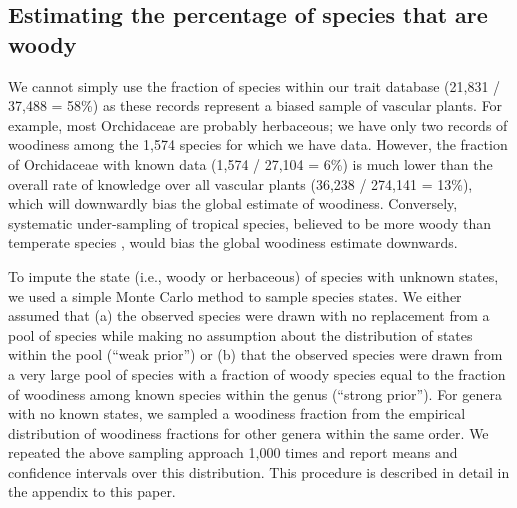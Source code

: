 \documentclass[12pt]{article}
\begin{document}

\subsection{Estimating the percentage of species that are woody}

We cannot simply use the fraction of species within our trait database
(21,831 / 37,488 = 58\%) as these records represent a biased sample of
vascular plants.
For example, most Orchidaceae are probably herbaceous; we have only
two records of woodiness among the 1,574 species for which we have
data.
However, the fraction of Orchidaceae with known data (1,574 / 27,104 =
6\%)
is much lower than the overall rate of knowledge over all vascular
plants (36,238 / 274,141 = 13\%), which will downwardly bias the
global estimate of woodiness.
%
Conversely, systematic under-sampling of tropical species, believed to
be more woody than temperate species \citep{Molesheihgt}, would bias
the global woodiness estimate downwards.

To impute the state (i.e., woody or herbaceous) of species with
unknown states, we used a simple Monte Carlo method to sample species
states.  We either assumed that (a) the observed species were drawn
with no replacement from a pool of species while making no assumption
about the distribution of states within the pool (``weak prior'') or
(b) that the observed species were drawn from a very large pool of
species with a fraction of woody species equal to the fraction of
woodiness among known species within the genus (``strong prior'').
%
For genera with no known states, we sampled a woodiness fraction from
the empirical distribution of woodiness fractions for other genera
within the same order.
%
We repeated the above sampling approach 1,000 times and report means
and confidence intervals over this distribution.
%
This procedure is described in detail in the appendix to this paper.
\end{document}

